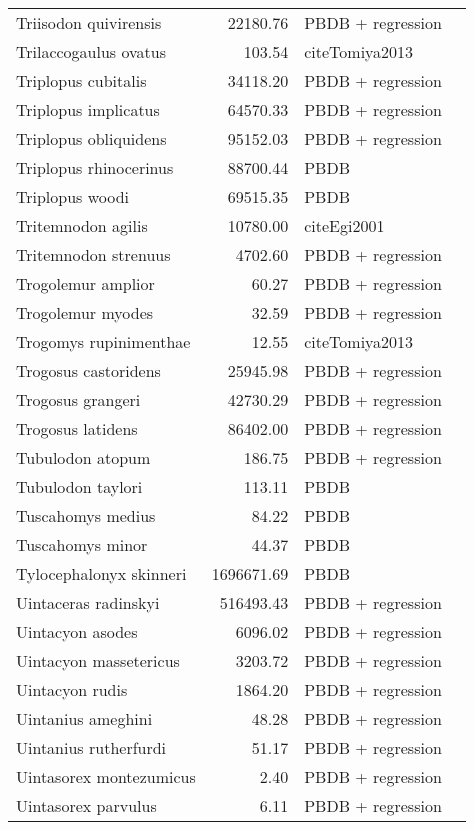 \begin{table}[ht]
\begin{tabular}{lrll}
  Triisodon quivirensis & 22180.76 & PBDB + regression &  \\ 
  Trilaccogaulus ovatus & 103.54 & cite{Tomiya2013} &  \\ 
  Triplopus cubitalis & 34118.20 & PBDB + regression &  \\ 
  Triplopus implicatus & 64570.33 & PBDB + regression &  \\ 
  Triplopus obliquidens & 95152.03 & PBDB + regression &  \\ 
  Triplopus rhinocerinus & 88700.44 & PBDB &  \\ 
  Triplopus woodi & 69515.35 & PBDB &  \\ 
  Tritemnodon agilis & 10780.00 & cite{Egi2001} &  \\ 
  Tritemnodon strenuus & 4702.60 & PBDB + regression &  \\ 
  Trogolemur amplior & 60.27 & PBDB + regression &  \\ 
  Trogolemur myodes & 32.59 & PBDB + regression &  \\ 
  Trogomys rupinimenthae & 12.55 & cite{Tomiya2013} &  \\ 
  Trogosus castoridens & 25945.98 & PBDB + regression &  \\ 
  Trogosus grangeri & 42730.29 & PBDB + regression &  \\ 
  Trogosus latidens & 86402.00 & PBDB + regression &  \\ 
  Tubulodon atopum & 186.75 & PBDB + regression &  \\ 
  Tubulodon taylori & 113.11 & PBDB &  \\ 
  Tuscahomys medius & 84.22 & PBDB &  \\ 
  Tuscahomys minor & 44.37 & PBDB &  \\ 
  Tylocephalonyx skinneri & 1696671.69 & PBDB &  \\ 
  Uintaceras radinskyi & 516493.43 & PBDB + regression &  \\ 
  Uintacyon asodes & 6096.02 & PBDB + regression &  \\ 
  Uintacyon massetericus & 3203.72 & PBDB + regression &  \\ 
  Uintacyon rudis & 1864.20 & PBDB + regression &  \\ 
  Uintanius ameghini & 48.28 & PBDB + regression &  \\ 
  Uintanius rutherfurdi & 51.17 & PBDB + regression &  \\ 
  Uintasorex montezumicus & 2.40 & PBDB + regression &  \\ 
  Uintasorex parvulus & 6.11 & PBDB + regression &  \\ 

\end{tabular}
\end{table}
